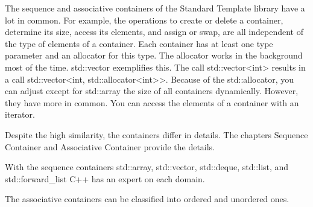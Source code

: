 

The sequence and associative containers of the Standard Template library have a lot in common. For example, the operations to create or delete a container, determine its size, access its elements, and assign or swap, are all independent of the type of elements of a container. Each container has at least one type parameter and an allocator for this type. The allocator works in the background most of the time. std::vector exemplifies this. The call std::vector<int> results in a call std::vector<int, std::allocator<int>{}>. Because of the std::allocator, you can adjust except for std::array the size of all containers dynamically. However, they have more in common. You can access the elements of a container with an iterator.

Despite the high similarity, the containers differ in details. The chapters Sequence Container and Associative Container provide the details.

With the sequence containers std::array, std::vector, std::deque, std::list, and std::forward\_list C++ has an expert on each domain.

The associative containers can be classified into ordered and unordered ones.


















